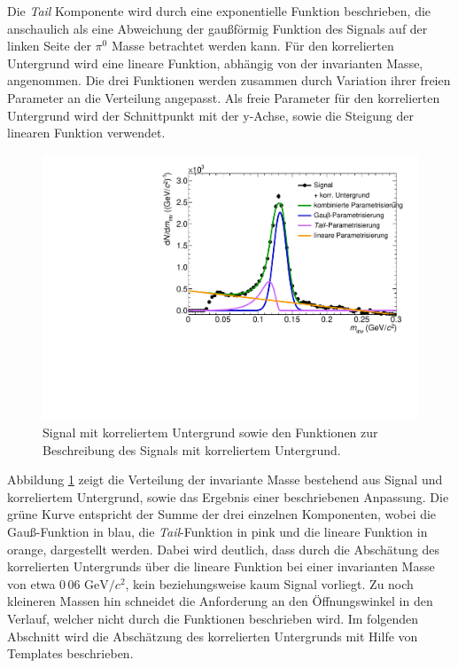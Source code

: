 Die \textit{Tail} Komponente wird durch eine exponentielle Funktion beschrieben, die anschaulich als eine Abweichung der gau{\ss}f\"ormig Funktion des Signals auf der linken Seite der $\pi^{0}$ Masse betrachtet werden kann.
\newline
F\"ur den korrelierten Untergrund wird eine lineare Funktion, abh\"angig von der invarianten Masse, angenommen.
\newline
Die drei Funktionen werden zusammen durch Variation ihrer freien Parameter an die Verteilung angepasst.
Als freie Parameter f\"ur den korrelierten Untergrund wird der Schnittpunkt mit der y-Achse, sowie die Steigung der linearen Funktion verwendet.
\begin{figure}[tp]
\centering
\includegraphics[width=.75\linewidth]{StandardParam.pdf}
\caption{Signal mit korreliertem Untergrund sowie den Funktionen zur Beschreibung des Signals mit korreliertem Untergrund.}
\label{figStandardParam}
\end{figure}
\newline
Abbildung \ref{figStandardParam} zeigt die Verteilung der invariante Masse bestehend aus Signal und korreliertem Untergrund, sowie das Ergebnis einer beschriebenen Anpassung.
Die gr\"une Kurve entspricht der Summe der drei einzelnen Komponenten, wobei die Gau{\ss}-Funktion in blau, die \textit{Tail}-Funktion in pink und die lineare Funktion in orange, dargestellt werden.
Dabei wird deutlich, dass durch die Absch\"atung des korrelierten Untergrunds \"uber die lineare Funktion bei einer invarianten Masse von etwa $0\,06\text{ GeV}/c^{2}$, kein beziehungsweise kaum Signal vorliegt.
Zu noch kleineren Massen hin schneidet die Anforderung an den \"Offnungswinkel in den Verlauf, welcher nicht durch die Funktionen beschrieben wird.
\newline
Im folgenden Abschnitt wird die Absch\"atzung des korrelierten Untergrunds mit Hilfe von Templates beschrieben.